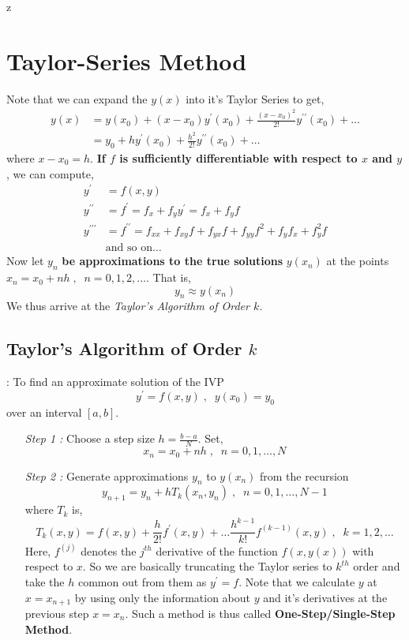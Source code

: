 z\documentclass[a4paper,12pt,twoside]{book}
\newcommand{\nll}[0]{\newline\newline}
\newcommand{\tit}[1]{\textit{#1}}
\newcommand{\algo}[0]{\boxed{\textbf{\textit{Algorithm}}}}
\renewcommand{\d}[0]{\prime}
\begin{document}
\section{Taylor-Series Method}
Note that we can expand the $y(x)$ into it's Taylor Series to get,
\begin{equation*}
\begin{split}
    y(x) &= y(x_0) + (x-x_0)y^\d(x_0) + \frac{(x-x_0)^2}{2!} y^{\d\d}(x_0) + \dots\\
    &= y_0 + hy^\d(x_0) + \frac{h^2}{2!} y^{\d\d}(x_0)+ \dots
\end{split}
\end{equation*}
where $x-x_0 = h$. \textbf{If $f$ is sufficiently differentiable with respect to $x$ and $y$}, we can compute,
\begin{equation*}
\begin{split}
    y^\d &= f(x,y)\\
    y^{\d\d} &= f^\d = f_x + f_y y^\d = f_x + f_yf\\
    y^{\d\d\d} &= f^{\d\d} = f_{xx} + f_{xy}f + f_{yx}f + f_{yy}f^2 + f_yf_x + f_y^2f\\
    &\text{and so on} \dots
\end{split}
\end{equation*}
Now let $y_n$ \textbf{be approximations to the true solutions} $y(x_n)$ at the points $x_n = x_0 + nh\;,\;\;n=0,1,2,\dots$. That is,
\begin{equation*}
    y_n \approx y(x_n)
\end{equation*}
We thus arrive at the \textit{Taylor's Algorithm of Order $k$.}
\subsection{Taylor's Algorithm of Order $k$}
\algo : To find an approximate solution of the IVP
\[y^\d = f(x,y)\;,\;\;y(x_0) = y_0\]
over an interval $[a,b]$.
\begin{enumerate}
    \item[\textit{Step 1 : }]{Choose a step size $h = \frac{b-a}{N}$. Set,
    \[x_n = x_0 + nh\;,\;\;n = 0,1,\dots,N\]
    }
    \item[\tit{Step 2 : }]{Generate approximations $y_n$ to $y(x_n)$ from the recursion
    \[y_{n+1} = y_n + hT_k(x_n,y_n)\;,\;\;n=0,1,\dots,N-1\]
    where $T_k$ is,
    \[T_k(x,y) = f(x,y) + \frac{h}{2!}f^\d(x,y) + \dots\frac{h^{k-1}}{k!}f^{(k-1)}(x,y)\;,\;\;k=1,2,\dots\]
    Here, $f^{(j)}$ denotes the $j^{th}$ derivative of the function $f(x,y(x))$ with respect to $x$.
    \nll
    So we are basically truncating the Taylor series to $k^{th}$ order and take the $h$ common out from them as $y^\d = f$.
    \nll
    Note that we calculate $y$ at $x = x_{n+1}$ by using only the information about $y$ and it's derivatives at the previous step $x = x_n$. Such a method is thus called \textbf{One-Step/Single-Step Method}.}
    
\end{enumerate}
\end{document}
